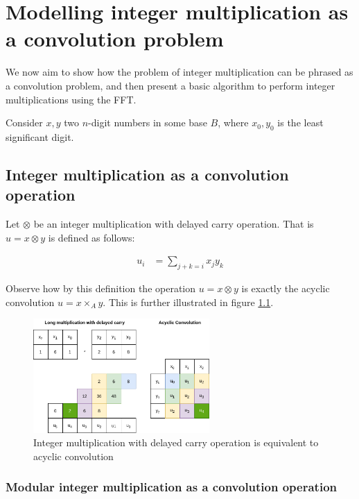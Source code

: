 \chapter{Modelling integer multiplication as a convolution problem}
\label{chapter:integer_multiplication_convolution}

We now aim to show how the problem of integer multiplication can be phrased as
a convolution problem, and then present a basic algorithm to perform integer
multiplications using the FFT.

Consider $x, y$ two $n$-digit numbers in some base $B$, where $x_0, y_0$ is the
least significant digit.

\section{Integer multiplication as a convolution operation}

Let $\otimes$ be an integer multiplication with delayed carry operation. That
is $u = x \otimes y$ is defined as follows:

\begin{align*}
		u_i & = \sum_{j + k = i} x_j y_k
\end{align*}

Observe how by this definition the operation $u = x \otimes y$ is exactly the
acyclic convolution $u = x \times_A y$. This is further illustrated in figure
\ref{fig:multiplication_convolution}.

\begin{figure}
		\centering
		\includegraphics[width=0.6\textwidth]{../resources/multiplication_convolution.drawio.png}
		\caption{Integer multiplication with delayed carry operation is equivalent to acyclic convolution}
		\label{fig:multiplication_convolution}
\end{figure}

\subsection{Modular integer multiplication as a convolution operation}
\label{sec:modular_integer_multiplication_convolution}

